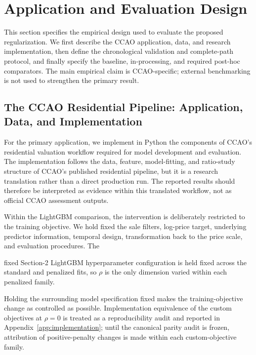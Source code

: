 \documentclass[10pt]{article}
\theoremstyle{definition}
\newcommand{\1}{\mathbf{1}}
\begin{document}
\section{Application and Evaluation Design}
\label{sec:empirical_design}

{This section specifies the empirical design used to evaluate the proposed regularization. We first describe the CCAO application, data, and research implementation, then define the chronological validation and complete-path protocol, and finally specify the baseline, in-processing, and required post-hoc comparators. The main empirical claim is CCAO-specific; external benchmarking is not used to strengthen the primary result.}


\subsection{The CCAO Residential Pipeline: Application, Data, and Implementation}
\label{subsec:ccao_design}


{For the primary application, we implement in Python the components of CCAO's residential valuation workflow required for model development and evaluation. The implementation follows the data, feature, model-fitting, and ratio-study structure of CCAO's published residential pipeline, but it is a research translation rather than a direct production run. The reported results should therefore be interpreted as evidence within this translated workflow, not as official CCAO assessment outputs.}


{Within the LightGBM comparison, the intervention is deliberately restricted to the training objective. We hold fixed the sale filters, log-price target, underlying predictor information, temporal design, transformation back to the price scale, and evaluation procedures. The

fixed Section-2 LightGBM hyperparameter configuration is held fixed across the standard and penalized fits, so $\rho$ is the only dimension varied within each penalized family.


Holding the surrounding model specification fixed makes the training-objective change as controlled as possible. Implementation equivalence of the custom objectives at $\rho=0$ is treated as a reproducibility audit and reported in Appendix~\ref{app:implementation}; until the canonical parity audit is frozen, attribution of positive-penalty changes is made within each custom-objective family.}
\end{document}

